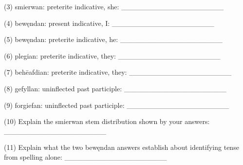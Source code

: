 \begin{minipage}{\linewidth}
(3) smierwan: preterite indicative, she: \_\_\_\_\_\_\_\_\_\_\_\_\_\_\_\_\_\_\_\_

(4) bewęndan: present indicative, I: \_\_\_\_\_\_\_\_\_\_\_\_\_\_\_\_\_\_\_\_

(5) bewęndan: preterite indicative, he: \_\_\_\_\_\_\_\_\_\_\_\_\_\_\_\_\_\_\_\_

(6) plegian: preterite indicative, they: \_\_\_\_\_\_\_\_\_\_\_\_\_\_\_\_\_\_\_\_

(7) behēafdian: preterite indicative, they: \_\_\_\_\_\_\_\_\_\_\_\_\_\_\_\_\_\_\_\_

(8) gefyllan: uninflected past participle: \_\_\_\_\_\_\_\_\_\_\_\_\_\_\_\_\_\_\_\_

(9) forgiefan: uninflected past participle: \_\_\_\_\_\_\_\_\_\_\_\_\_\_\_\_\_\_\_\_

(10) Explain the smierwan stem distribution shown by your answers: \_\_\_\_\_\_\_\_\_\_\_\_\_\_\_\_\_\_\_\_

(11) Explain what the two bewęndan answers establish about identifying tense from spelling alone: \_\_\_\_\_\_\_\_\_\_\_\_\_\_\_\_\_\_\_\_

\end{minipage}\par\addvspace{4pt}

